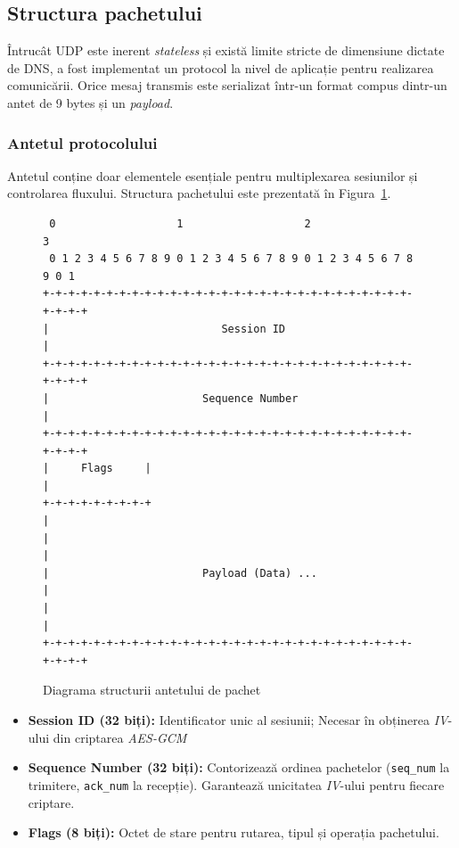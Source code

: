 \subsection{Structura pachetului}
Întrucât UDP este inerent \textit{stateless} și există limite stricte de dimensiune dictate de DNS, a fost implementat un protocol la nivel de aplicație pentru realizarea comunicării. Orice mesaj transmis este serializat într-un format compus dintr-un antet de 9 bytes și un \textit{payload}.

\subsubsection{Antetul protocolului}
Antetul conține doar elementele esențiale pentru multiplexarea sesiunilor și controlarea fluxului. Structura pachetului este prezentată în Figura~\ref{fig:struct_pachet}.

\begin{figure}[htbp]
    \centering
    \begin{minipage}{11cm}
    \scriptsize
\begin{verbatim}
 0                   1                   2                   3
 0 1 2 3 4 5 6 7 8 9 0 1 2 3 4 5 6 7 8 9 0 1 2 3 4 5 6 7 8 9 0 1
+-+-+-+-+-+-+-+-+-+-+-+-+-+-+-+-+-+-+-+-+-+-+-+-+-+-+-+-+-+-+-+-+
|                           Session ID                          |
+-+-+-+-+-+-+-+-+-+-+-+-+-+-+-+-+-+-+-+-+-+-+-+-+-+-+-+-+-+-+-+-+
|                        Sequence Number                        |
+-+-+-+-+-+-+-+-+-+-+-+-+-+-+-+-+-+-+-+-+-+-+-+-+-+-+-+-+-+-+-+-+
|     Flags     |                                               |
+-+-+-+-+-+-+-+-+                                               |
|                                                               |
|                        Payload (Data) ...                     |
|                                                               |
+-+-+-+-+-+-+-+-+-+-+-+-+-+-+-+-+-+-+-+-+-+-+-+-+-+-+-+-+-+-+-+-+
\end{verbatim}
    \end{minipage}
    \caption{Diagrama structurii antetului de pachet}
    \label{fig:struct_pachet}
\end{figure}

\begin{itemize}
    \item \textbf{Session ID (32 biți):} Identificator unic al sesiunii; Necesar în obținerea \textit{IV}-ului din criptarea \textit{AES-GCM}
    \item \textbf{Sequence Number (32 biți):} Contorizează ordinea pachetelor (\texttt{seq\_num} la trimitere, \texttt{ack\_num} la recepție). Garantează unicitatea \textit{IV}-ului pentru fiecare criptare.
    \item \textbf{Flags (8 biți):} Octet de stare pentru rutarea, tipul și operația pachetului.
\end{itemize}

